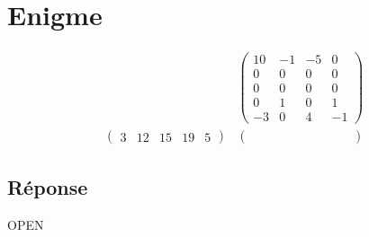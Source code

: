 \documentclass[a4paper,11pt]{article}
\begin{document}
\section*{Enigme}

\[
\begin{array}{cc}
\, &

\left(
\begin{array}{rrrr}
10 & -1 & -5 & 0 \\
0  & 0  & 0  & 0 \\
0  & 0  & 0  & 0 \\
0  & 1  & 0  & 1 \\
-3 & 0  & 4  & -1
\end{array}
\right) \\

\left(
\begin{array}{ccccc}
3 & 12 & 15 & 19 & 5
\end{array}
\right) &

\left(
\begin{array}{cccc}
\phantom{-0} & \phantom{-0} & \phantom{-0} & \phantom{-0}
\end{array}
\right)
\end{array}
\]

\subsection*{Réponse}
OPEN
\end{document}

